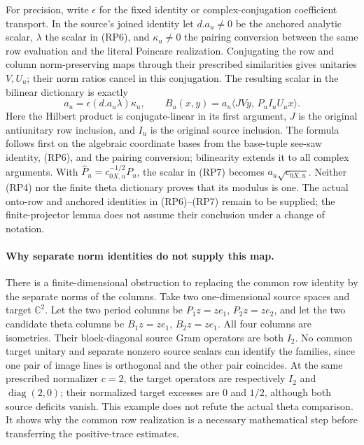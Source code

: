 For precision, write \(\epsilon\) for the fixed identity or
complex-conjugation coefficient transport. In the source's joined
identity let \(d.a_u\ne0\) be the anchored analytic scalar,
\(\lambda\) the scalar in (RP6), and \(\kappa_u\ne0\) the
pairing conversion between the same row evaluation and the
literal Poincare realization. Conjugating the row and column
norm-preserving maps through their prescribed similarities gives
unitaries \(V,U_u\); their norm ratios cancel in this conjugation.
The resulting scalar in the bilinear dictionary is exactly
\[
 a_u=\epsilon(d.a_u\lambda)\kappa_u,\qquad
 B_u(x,y)=a_u\langle JV y,\,P_u I_u U_u x\rangle.
                                                        \tag{RP7}
\]
Here the Hilbert product is conjugate-linear in its first argument,
\(J\) is the original antiunitary row inclusion, and \(I_u\)
is the original source inclusion. The formula follows first on
the algebraic coordinate bases from the base-tuple see-saw
identity, (RP6), and the pairing conversion; bilinearity extends
it to all complex arguments. With
\(\widehat P_u=c_{0X,u}^{-1/2}P_u\), the scalar in (RP7)
becomes \(a_u\sqrt{c_{0X,u}}\). Neither (RP4) nor the finite
theta dictionary proves that its modulus is one. The actual
onto-row and anchored identities in (RP6)--(RP7) remain to be
supplied; the finite-projector lemma does not assume their
conclusion under a change of notation.



\paragraph{Why separate norm identities do not supply this map.}
There is a finite-dimensional obstruction to replacing the common
row identity by the separate norms of the columns. Take two
one-dimensional source spaces and target \(\mathbb C^2\).
Let the two period columns be \(P_1z=ze_1\), \(P_2z=ze_2\),
and let the two candidate theta columns be
\(B_1z=ze_1\), \(B_2z=ze_1\). All four columns are isometries.
Their block-diagonal source Gram operators are both \(I_2\).
No common target
unitary and separate nonzero source scalars can identify the
families, since one pair of image lines is orthogonal and the
other pair coincides. At the same prescribed normalizer \(c=2\),
the target operators are respectively \(I_2\) and
\(\operatorname{diag}(2,0)\); their normalized target excesses
are \(0\) and \(1/2\), although both source deficits vanish.
This example does not refute the actual theta comparison. It
shows why the common row realization is a necessary mathematical
step before transferring the positive-trace estimates.

